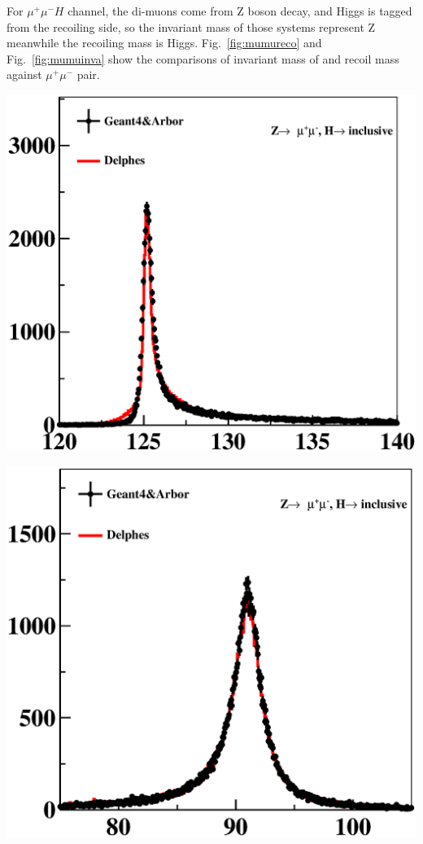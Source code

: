 \documentclass[a4paper,10pt,twoside]{cpc-hepnp}
\begin{document}
For $\mu^+\mu^-H$ channel, the di-muons come from Z boson decay, and Higgs is tagged from the recoiling side, so the invariant mass of those systems represent Z meanwhile the recoiling mass is Higgs. 
Fig.~\ref{fig:mumureco} and Fig.~\ref{fig:mumuinva} show the comparisons of invariant mass of and recoil mass against $\mu^+\mu^-$ pair. 

\begin{center}
\includegraphics[width=0.9\linewidth]{e2e2h_reco}
\end{center}
\begin{center}
\includegraphics[width=0.9\linewidth]{e2e2h_mass}
\end{center}
\end{document}

